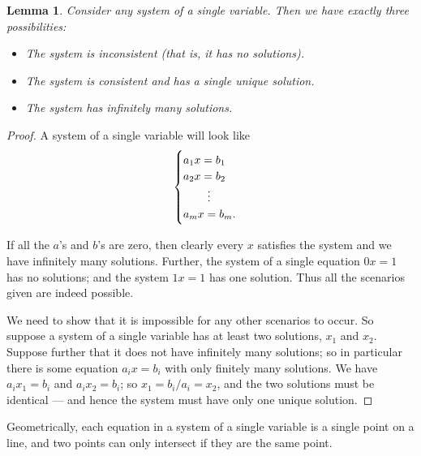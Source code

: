 \documentclass[a4paper,leqno]{article}
\numberwithin{equation}{section}
\newtheorem{lem}[equation]{Lemma}
\theoremstyle{definition}
\theoremstyle{remark}
\begin{document}
\begin{lem}
  Consider any system of a single variable. Then we have exactly three possibilities:
  \begin{itemize}
    \item The system is inconsistent (that is, it has no solutions).
    \item The system is consistent and has a single unique solution.
    \item The system has infinitely many solutions.
  \end{itemize}
\end{lem}
\begin{proof}
  A system of a single variable will look like
  \begin{equation}
    \begin{cases}
      a_1 x = b_1\\
      a_2 x = b_2\\
        \hspace{0.15em}\qquad\vdots\\
      a_m x = b_m.
    \end{cases}
  \end{equation}

  If all the $ a$'s and $ b$'s are zero, then clearly every $ x $ satisfies the system and we have infinitely many solutions.
  Further, the system of a single equation $ 0x = 1 $ has no solutions; and the system $ 1x = 1 $ has one solution. Thus all
  the scenarios given are indeed possible.

  We need to show that it is impossible for any other scenarios to occur. So suppose a system of a single variable has at least two
  solutions, $ x_1 $ and $ x_2 $. Suppose further that it does not have infinitely many solutions; so in particular there
  is some equation $ a_i x = b_i $ with only finitely many solutions. We have $ a_i x_1 = b_i $ and $ a_i x_2 = b_i $;
  so $ x_1 = b_i/a_i = x_2 $, and the two solutions must be identical --- and hence the system must have only one unique solution.
\end{proof}

Geometrically, each equation in a system of a single variable is a single point on a line, and two points can only intersect if they
are the same point.
\end{document}
